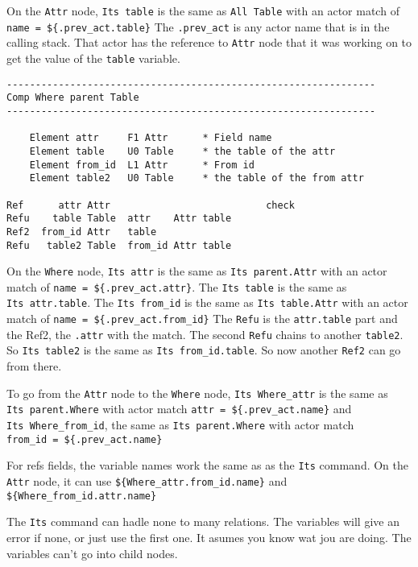 On the \texttt{Attr} node, \texttt{Its\ table} is the same as
\texttt{All\ Table} with an actor match of
\texttt{name\ =\ \$\{.prev\_act.table\}} The \texttt{.prev\_act} is any
actor name that is in the calling stack. That actor has the reference to
\texttt{Attr} node that it was working on to get the value of the
\texttt{table} variable.

\begin{verbatim}
----------------------------------------------------------------
Comp Where parent Table
----------------------------------------------------------------

    Element attr     F1 Attr      * Field name
    Element table    U0 Table     * the table of the attr
    Element from_id  L1 Attr      * From id
    Element table2   U0 Table     * the table of the from attr

Ref      attr Attr                           check
Refu    table Table  attr    Attr table
Ref2  from_id Attr   table
Refu   table2 Table  from_id Attr table
\end{verbatim}

On the \texttt{Where} node, \texttt{Its\ attr} is the same as
\texttt{Its\ parent.Attr} with an actor match of
\texttt{name\ =\ \$\{.prev\_act.attr\}}. The \texttt{Its\ table} is the
same as \texttt{Its\ attr.table}. The \texttt{Its\ from\_id} is the same
as \texttt{Its\ table.Attr} with an actor match of
\texttt{name\ =\ \$\{.prev\_act.from\_id\}} The \texttt{Refu} is the
\texttt{attr.table} part and the Ref2, the \texttt{.attr} with the
match. The second \texttt{Refu} chains to another \texttt{table2}. So
\texttt{Its\ table2} is the same as \texttt{Its\ from\_id.table}. So now
another \texttt{Ref2} can go from there.

To go from the \texttt{Attr} node to the \texttt{Where} node,
\texttt{Its\ Where\_attr} is the same as \texttt{Its\ parent.Where} with
actor match \texttt{attr\ =\ \$\{.prev\_act.name\}} and
\texttt{Its\ Where\_from\_id}, the same as \texttt{Its\ parent.Where}
with actor match \texttt{from\_id\ =\ \$\{.prev\_act.name\}}

For refs fields, the variable names work the same as as the \texttt{Its}
command. On the \texttt{Attr} node, it can use
\texttt{\$\{Where\_attr.from\_id.name\}} and
\texttt{\$\{Where\_from\_id.attr.name\}}

The \texttt{Its} command can hadle none to many relations. The variables
will give an error if none, or just use the first one. It asumes you
know wat jou are doing. The variables can't go into child nodes.


